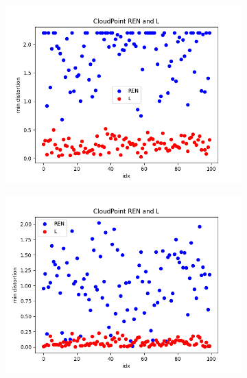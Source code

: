 \documentclass[conference]{IEEEtran}
\begin{document}
\begin{figure}[htbp]
\begin{subfigure}[b]{0.15\textwidth}
    \includegraphics[width=\textwidth]
    {figures/experiment 2/pendulumout}
    \caption{}
  \end{subfigure}
  \newline
  \hspace*{\fill}
  \begin{subfigure}[b]{0.15\textwidth}
    \includegraphics[width=\textwidth]{figures/experiment 2/Q2dstate}
    \caption{}
  \end{subfigure}
  \hspace{15pt} %
  \begin{subfigure}[b]{0.15\textwidth}

\end{subfigure}
\end{figure}
\end{document}
